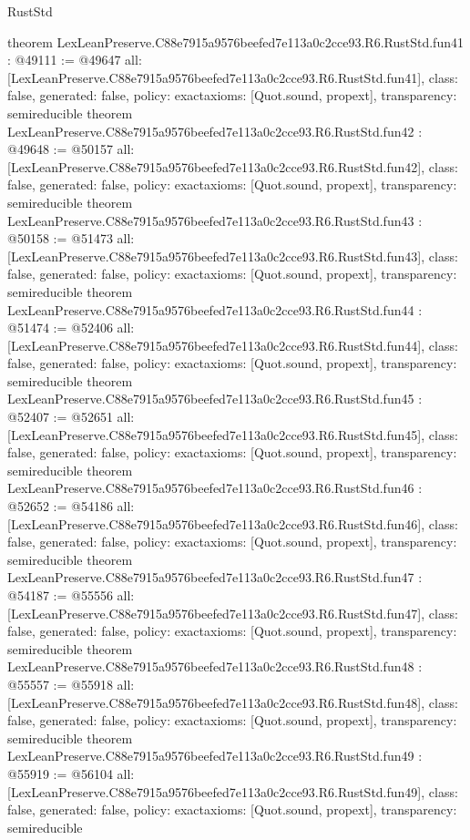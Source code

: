 \begin{lexlean}{RustStd}
\begin{coremodule}
{}
theorem LexLeanPreserve.C88e7915a9576beefed7e113a0c2cce93.R6.RustStd.fun41 : @49111 := @49647 {
  all: [LexLeanPreserve.C88e7915a9576beefed7e113a0c2cce93.R6.RustStd.fun41],
  class: false,
  generated: false,
  policy: exact{axioms: [Quot.sound, propext]},
  transparency: semireducible
}
theorem LexLeanPreserve.C88e7915a9576beefed7e113a0c2cce93.R6.RustStd.fun42 : @49648 := @50157 {
  all: [LexLeanPreserve.C88e7915a9576beefed7e113a0c2cce93.R6.RustStd.fun42],
  class: false,
  generated: false,
  policy: exact{axioms: [Quot.sound, propext]},
  transparency: semireducible
}
theorem LexLeanPreserve.C88e7915a9576beefed7e113a0c2cce93.R6.RustStd.fun43 : @50158 := @51473 {
  all: [LexLeanPreserve.C88e7915a9576beefed7e113a0c2cce93.R6.RustStd.fun43],
  class: false,
  generated: false,
  policy: exact{axioms: [Quot.sound, propext]},
  transparency: semireducible
}
theorem LexLeanPreserve.C88e7915a9576beefed7e113a0c2cce93.R6.RustStd.fun44 : @51474 := @52406 {
  all: [LexLeanPreserve.C88e7915a9576beefed7e113a0c2cce93.R6.RustStd.fun44],
  class: false,
  generated: false,
  policy: exact{axioms: [Quot.sound, propext]},
  transparency: semireducible
}
theorem LexLeanPreserve.C88e7915a9576beefed7e113a0c2cce93.R6.RustStd.fun45 : @52407 := @52651 {
  all: [LexLeanPreserve.C88e7915a9576beefed7e113a0c2cce93.R6.RustStd.fun45],
  class: false,
  generated: false,
  policy: exact{axioms: [Quot.sound, propext]},
  transparency: semireducible
}
theorem LexLeanPreserve.C88e7915a9576beefed7e113a0c2cce93.R6.RustStd.fun46 : @52652 := @54186 {
  all: [LexLeanPreserve.C88e7915a9576beefed7e113a0c2cce93.R6.RustStd.fun46],
  class: false,
  generated: false,
  policy: exact{axioms: [Quot.sound, propext]},
  transparency: semireducible
}
theorem LexLeanPreserve.C88e7915a9576beefed7e113a0c2cce93.R6.RustStd.fun47 : @54187 := @55556 {
  all: [LexLeanPreserve.C88e7915a9576beefed7e113a0c2cce93.R6.RustStd.fun47],
  class: false,
  generated: false,
  policy: exact{axioms: [Quot.sound, propext]},
  transparency: semireducible
}
theorem LexLeanPreserve.C88e7915a9576beefed7e113a0c2cce93.R6.RustStd.fun48 : @55557 := @55918 {
  all: [LexLeanPreserve.C88e7915a9576beefed7e113a0c2cce93.R6.RustStd.fun48],
  class: false,
  generated: false,
  policy: exact{axioms: [Quot.sound, propext]},
  transparency: semireducible
}
theorem LexLeanPreserve.C88e7915a9576beefed7e113a0c2cce93.R6.RustStd.fun49 : @55919 := @56104 {
  all: [LexLeanPreserve.C88e7915a9576beefed7e113a0c2cce93.R6.RustStd.fun49],
  class: false,
  generated: false,
  policy: exact{axioms: [Quot.sound, propext]},
  transparency: semireducible
}
\end{coremodule}
\end{lexlean}
